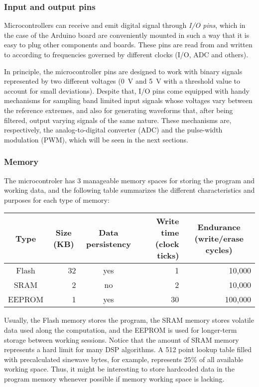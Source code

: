 \subsubsection{Input and output pins}

Microcontrollers can receive and emit digital signal through \emph{I/O pins},
which in the case of the Arduino board are conveniently mounted in such a way
that it is easy to plug other components and boards. These pins are read from
and written to according to frequencies governed by different clocks (I/O, ADC
and others).

In principle, the microcontroller pins are designed to work with binary
signals represented by two different voltages (0~V and 5~V with a threshold
value to account for small deviations). Despite
that, I/O pins come equipped with handy mechanisms for sampling band limited
input signals whose voltages vary between the reference extremes, and also for
generating waveforms that, after being filtered, output varying signals of the
same nature. These mechanisms are, respectively, the analog-to-digital
converter (ADC) and the pulse-width modulation (PWM), which will be seen in
the next sections.


\subsubsection{Memory}

The microcontroler has 3 manageable memory spaces for storing the program and
working data, and the following table summarizes the different characteristics
and purposes for each type of memory:

\begin{center}
\begin{tabular}{crcrr}
\toprule
\toprule
\multicolumn{1}{c}{\footnotesize{Type}} &
\multicolumn{1}{c}{\footnotesize{\parbox{2em}{Size (KB)}}} &
\footnotesize{\parbox{4em}{Data persistency}} &
\footnotesize{\parbox{5em}{Write time (clock ticks)}} &
\multicolumn{1}{c}{\footnotesize{\parbox{5em}{Endurance (write/erase cycles)}}} \\
\midrule
Flash  & 32 & yes & 1  & 10,000 \\
SRAM   & 2  & no  & 2  & 10,000 \\
EEPROM & 1  & yes & 30 & 100,000 \\ 
\bottomrule
\end{tabular}
\end{center}

Usually, the Flash memory stores the program, the SRAM memory stores volatile
data used along the computation, and the EEPROM is used for longer-term
storage between working sessions. Notice that the amount of SRAM memory
represents a hard limit for many DSP algorithms. A 512 point lookup table
filled with precalculated sinewave bytes, for example, represents $25\%$
of all available working space. Thus, it might be interesting to store
hardcoded data in the program memory whenever possible if memory working space
is lacking.



